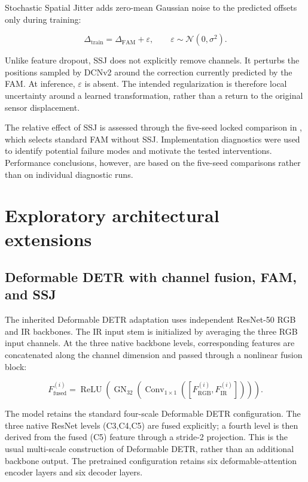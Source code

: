 Stochastic Spatial Jitter adds zero-mean Gaussian noise to the predicted
offsets only during training:

\begin{equation}
  \Delta_{\mathrm{train}}=\Delta_{\mathrm{FAM}}+\varepsilon,
  \qquad \varepsilon\sim\mathcal{N}(0,\sigma^2).
  \label{eq:ssj}
\end{equation}

Unlike feature dropout, SSJ does not explicitly remove channels. It perturbs
the positions sampled by DCNv2 around the correction currently predicted by
the FAM. At inference, \(\varepsilon\) is absent. The intended regularization
is therefore local uncertainty around a learned transformation, rather than a
return to the original sensor displacement.

The relative effect of SSJ is assessed through the five-seed locked comparison
in , which selects standard FAM without SSJ.
Implementation diagnostics were used to identify potential failure modes and
motivate the tested interventions. Performance conclusions, however, are based
on the five-seed comparisons rather than on individual diagnostic runs.

\section{Exploratory architectural extensions}

\subsection{Deformable DETR with channel fusion, FAM, and SSJ}
\label{sec:defdetr-exploration}

The inherited Deformable DETR adaptation uses independent ResNet-50 RGB and IR
backbones. The IR input stem is initialized by averaging the three RGB input
channels. At the three native backbone levels, corresponding features are
concatenated along the channel dimension and passed through a nonlinear fusion
block:

\begin{equation}
  F^{(i)}_{\mathrm{fused}}=
  \operatorname{ReLU}\!\left(
  \operatorname{GN}_{32}\!\left(
  \operatorname{Conv}_{1\times1}
  ([F^{(i)}_{\mathrm{RGB}},F^{(i)}_{\mathrm{IR}}])
  \right)\right).
  \label{eq:defdetr-channel-fusion}
\end{equation}

The model retains the standard four-scale Deformable DETR configuration. The
three native ResNet levels (C3,C4,C5) are fused explicitly; a fourth level is
then derived from the fused (C5) feature through a stride-2 projection. This
is the usual multi-scale construction of Deformable DETR, rather than an
additional backbone output. The pretrained configuration retains six
deformable-attention encoder layers and six decoder layers.

